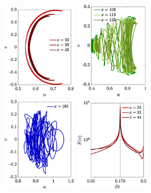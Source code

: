 \iffalse
\begin{figure}
\centering
\includegraphics[width=0.328\textwidth]{./fig/appendix/uv_xw_AR6_Re450_a.eps}
\includegraphics[width=0.328\textwidth]{./fig/appendix/uv_xw_AR6_Re450_b.eps}
\includegraphics[width=0.328\textwidth]{./fig/appendix/uv_xw_AR6_Re450_c.eps}
\includegraphics[width=0.328\textwidth]{./fig/appendix/Spec_AR6_Re450_a.eps}

\end{figure}
